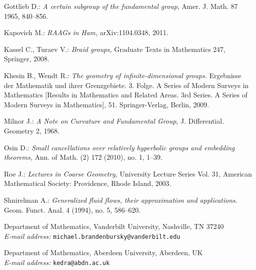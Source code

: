 \documentclass[a4paper,12pt]{amsart}
\theoremstyle{definition}
\begin{document}
\begin{thebibliography}{99}
Gottlieb D.: \textit{A certain subgroup of the fundamental group},
Amer. J. Math.  87  1965, 840--856.



%
 Kapovich M.: \textit{RAAGs in Ham,} arXiv:1104.0348, 2011.

 Kassel C., Turaev V.: \textit{Braid groups,} Graduate Texts in Mathematics 247, Springer, 2008.

Khesin B.,  Wendt R.: \textit{The geometry of infinite-dimensional groups.}
Ergebnisse der Mathematik und ihrer Grenzgebiete. 3. Folge. A Series of
Modern Surveys in Mathematics [Results in Mathematics and Related Areas. 3rd
Series. A Series of Modern Surveys in Mathematics], 51. Springer-Verlag, Berlin,  2009.



 Milnor J.: \textit{A Note on Curvature and Fundamental Group,} J. Differential. Geometry 2, 1968.

Osin D.: \textit{Small cancellations over relatively hyperbolic groups and embedding theorems,}
Ann. of Math. (2)  172  (2010),  no. 1, 1--39.


 Roe J.: \textit{Lectures in Coarse Geometry,} University Lecture Series Vol. 31, American Mathematical Society: Providence,
 Rhode Island, 2003.

 Shnirelman A.:  \textit{Generalized fluid flows, their approximation and applications}.
 Geom. Funct. Anal.  4  (1994),  no. 5, 586--620.



%


\end{thebibliography}

\bigskip

Department of Mathematics, Vanderbilt University, Nashville, TN 37240\\
\emph{E-mail address:} \verb"michael.brandenbursky@vanderbilt.edu"

\bigskip

Department of Mathematics, Aberdeen University, Aberdeen, UK\\
\emph{E-mail address:} \verb"kedra@abdn.ac.uk"
\end{document}
